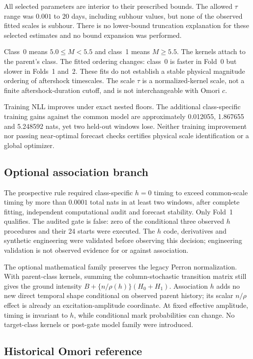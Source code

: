 All selected parameters are interior to their prescribed bounds. The allowed $\tau$ range was $0.001$ to $20$ days, including subhour values, but none of the observed fitted scales is subhour. There is no lower-bound truncation explanation for these selected estimates and no bound expansion was performed.

Class~0 means $5.0\le M<5.5$ and class~1 means $M\ge 5.5$. The kernels attach to the parent's class. The fitted ordering changes: class~0 is faster in Fold~0 but slower in Folds~1 and~2. These fits do not establish a stable physical magnitude ordering of aftershock timescales. The scale $\tau$ is a normalized-kernel scale, not a finite aftershock-duration cutoff, and is not interchangeable with Omori $c$.

Training NLL improves under exact nested floors. The additional class-specific training gains against the common model are approximately 0.012055, 1.867655 and 5.248592 nats, yet two held-out windows lose. Neither training improvement nor passing near-optimal forecast checks certifies physical scale identification or a global optimizer.

\subsection{Optional association branch}


The prospective rule required class-specific $h=0$ timing to exceed common-scale timing by more than $0.0001$ total nats in at least two windows, after complete fitting, independent computational audit and forecast stability. Only Fold~1 qualifies. The audited gate is false: zero of the conditional three observed $h$ procedures and their 24 starts were executed. The $h$ code, derivatives and synthetic engineering were validated before observing this decision; engineering validation is not observed evidence for or against association.

The optional mathematical family preserves the legacy Perron normalization. With parent-class kernels, summing the column-stochastic transition matrix still gives the ground intensity $B+\{n/\rho(h)\}(H_0+H_1)$. Association $h$ adds no new direct temporal shape conditional on observed parent history; its scalar $n/\rho$ effect is already an excitation-amplitude coordinate. At fixed effective amplitude, timing is invariant to $h$, while conditional mark probabilities can change. No target-class kernels or post-gate model family were introduced.

\subsection{Historical Omori reference}


